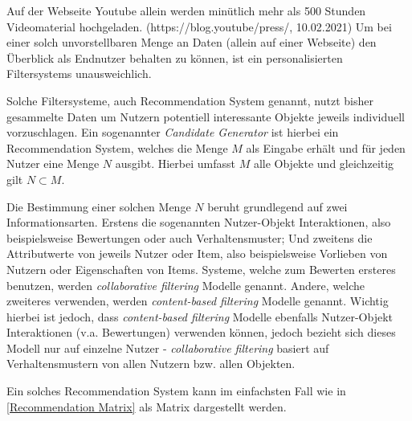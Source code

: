 Auf der Webseite Youtube allein werden minütlich mehr als 500 Stunden Videomaterial hochgeladen. (https://blog.youtube/press/, 10.02.2021)
Um bei einer solch unvorstellbaren Menge an Daten (allein auf einer Webseite) den Überblick als Endnutzer behalten zu können, ist ein personalisierten Filtersystems unausweichlich.

Solche Filtersysteme, auch Recommendation System genannt, nutzt bisher gesammelte Daten um Nutzern potentiell interessante Objekte jeweils individuell vorzuschlagen.
Ein sogenannter \textit{Candidate Generator} ist hierbei ein Recommendation System, welches die Menge $M$ als Eingabe erhält und für jeden Nutzer eine Menge $N$ ausgibt. Hierbei umfasst $M$ alle Objekte und gleichzeitig gilt $N \subset M$. 

Die Bestimmung einer solchen Menge $N$ beruht grundlegend auf zwei Informationsarten. Erstens die sogenannten Nutzer-Objekt Interaktionen, also beispielsweise Bewertungen oder auch Verhaltensmuster; Und zweitens die Attributwerte von jeweils Nutzer oder Item, also beispielsweise Vorlieben von Nutzern oder Eigenschaften von Items.\cite{aggarwal2016}
Systeme, welche zum Bewerten ersteres benutzen, werden \textit{collaborative filtering} Modelle genannt. Andere, welche zweiteres verwenden, werden \textit{content-based filtering} Modelle genannt. Wichtig hierbei ist jedoch, dass \textit{content-based filtering} Modelle ebenfalls Nutzer-Objekt Interaktionen (v.a. Bewertungen) verwenden können, jedoch bezieht sich dieses Modell nur auf einzelne Nutzer - \textit{collaborative filtering} basiert auf Verhaltensmustern von allen Nutzern bzw. allen Objekten.

Ein solches Recommendation System kann im einfachsten Fall wie in \ref{Recommendation Matrix} als Matrix dargestellt werden.

